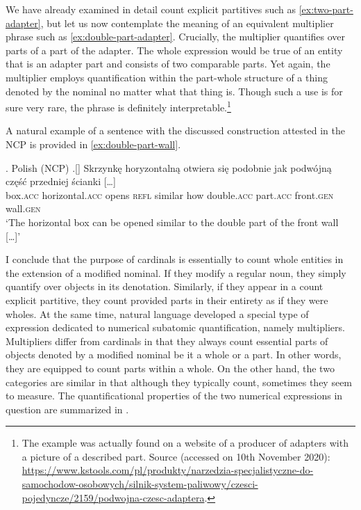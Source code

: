 We have already examined in detail count explicit partitives such as \ref{ex:two-part-adapter}, but let us now contemplate the meaning of an equivalent multiplier phrase such as \ref{ex:double-part-adapter}. Crucially, the multiplier quantifies over parts of a part of the adapter. The whole expression would be true of an entity that is an adapter part and consists of two comparable parts. Yet again, the multiplier employs quantification within the part-whole structure of a thing denoted by the nominal no matter what that thing is. Though such a use is for sure very rare, the phrase is definitely interpretable.\footnote{The example was actually found on a website of a producer of adapters with a picture of a described part. Source (accessed on 10th November 2020): \url{https://www.kstools.com/pl/produkty/narzedzia-specjalistyczne-do-samochodow-osobowych/silnik-system-paliwowy/czesci-pojedyncze/2159/podwojna-czesc-adaptera}.}

A natural example of a sentence with the discussed construction attested in the NCP is provided in \ref{ex:double-part-wall}.

\ex. Polish (NCP)\label{ex:double-part-wall}
\bg.[] Skrzynkę horyzontalną otwiera się podobnie jak podwójną część przedniej ścianki [\dots]\\
box\textsc{.acc} horizontal\textsc{.acc} opens \textsc{refl} similar how double\textsc{.acc} part\textsc{.acc} front\textsc{.gen} wall\textsc{.gen}\\
`The horizontal box can be opened similar to the double part of the front wall [\dots]'

I conclude that the purpose of cardinals is essentially to count whole entities in the extension of a modified nominal. If they modify a regular noun, they simply quantify over objects in its denotation. Similarly, if they appear in a count explicit partitive, they count provided parts in their entirety as if they were wholes. At the same time, natural language developed a special type of expression dedicated to numerical subatomic quantification, namely multipliers. Multipliers differ from cardinals in that they always count essential parts of objects denoted by a modified nominal be it a whole or a part. In other words, they are equipped to count parts within a whole. On the other hand, the two categories are similar in that although they typically count, sometimes they seem to measure. The quantificational properties of the two numerical expressions in question are summarized in  .


